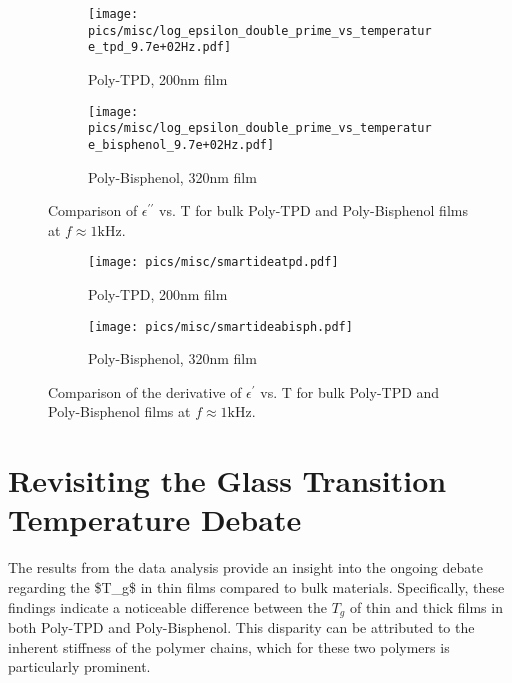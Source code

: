 \begin{figure}[!htb]
\centering
\begin{subfigure}[t]{.5\textwidth}
  \centering
  \texttt{[image: pics/misc/log\_epsilon\_double\_prime\_vs\_temperature\_tpd\_9.7e+02Hz.pdf]}
  \caption{Poly-TPD, 200nm film}
  \label{epsvsttpd}
\end{subfigure}%
\begin{subfigure}[t]{.5\textwidth}
  \centering
  \texttt{[image: pics/misc/log\_epsilon\_double\_prime\_vs\_temperature\_bisphenol\_9.7e+02Hz.pdf]}
  \caption{Poly-Bisphenol, 320nm film}
  \label{epsvstbisph}
\end{subfigure}
\caption{Comparison of $\epsilon^{\prime\prime}$ vs. T for bulk Poly-TPD and Poly-Bisphenol films at $f \approx 1\text{kHz}$.}
\label{epsvstcomparison}
\end{figure}
\begin{figure}[!htb]
\centering
\begin{subfigure}[t]{.5\textwidth}
  \centering
  \texttt{[image: pics/misc/smartideatpd.pdf]}
  \caption{Poly-TPD, 200nm film}
  \label{smartepsvsttpd}
\end{subfigure}%
\begin{subfigure}[t]{.5\textwidth}
  \centering
  \texttt{[image: pics/misc/smartideabisph.pdf]}
  \caption{Poly-Bisphenol, 320nm film}
  \label{smartepsvstbisph}
\end{subfigure}
\caption{Comparison of the derivative of $\epsilon^{\prime}$ vs. T for bulk Poly-TPD and Poly-Bisphenol films at $f \approx 1\text{kHz}$.}
\label{smartepsvstcomparison}
\end{figure}


\section{Revisiting the Glass Transition Temperature Debate}

The results from the data analysis provide an insight into the ongoing debate regarding the \ac{$T_g$} in thin films compared to bulk materials. Specifically, these findings indicate a noticeable difference between the \(T_g\) of thin and thick films in both Poly-TPD and Poly-Bisphenol. This disparity can be attributed to the inherent stiffness of the polymer chains, which for these two polymers is particularly prominent.

